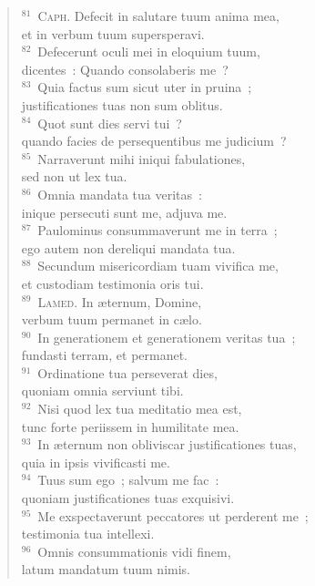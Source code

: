 \begin{flushleft}
\begin{verse}
${}^{81}$~\textsc{Caph.} Defecit in salutare tuum anima mea,\\ et in verbum tuum supersperavi.\\
${}^{82}$~Defecerunt oculi mei in eloquium tuum,\\ dicentes~: Quando consolaberis me~?\\
${}^{83}$~Quia factus sum sicut uter in pruina~;\\ justificationes tuas non sum oblitus.\\
${}^{84}$~Quot sunt dies servi tui~?\\ quando facies de persequentibus me judicium~?\\
${}^{85}$~Narraverunt mihi iniqui fabulationes,\\ sed non ut lex tua.\\
${}^{86}$~Omnia mandata tua veritas~:\\ inique persecuti sunt me, adjuva me.\\
${}^{87}$~Paulominus consummaverunt me in terra~;\\ ego autem non dereliqui mandata tua.\\
${}^{88}$~Secundum misericordiam tuam vivifica me,\\ et custodiam testimonia oris tui.\\
${}^{89}$~\textsc{Lamed.} In \ae ternum, Domine,\\ verbum tuum permanet in c\ae lo.\\
${}^{90}$~In generationem et generationem veritas tua~;\\ fundasti terram, et permanet.\\
${}^{91}$~Ordinatione tua perseverat dies,\\ quoniam omnia serviunt tibi.\\
${}^{92}$~Nisi quod lex tua meditatio mea est,\\ tunc forte periissem in humilitate mea.\\
${}^{93}$~In \ae ternum non obliviscar justificationes tuas,\\ quia in ipsis vivificasti me.\\
${}^{94}$~Tuus sum ego~; salvum me fac~:\\ quoniam justificationes tuas exquisivi.\\
${}^{95}$~Me exspectaverunt peccatores ut perderent me~;\\ testimonia tua intellexi.\\
${}^{96}$~Omnis consummationis vidi finem,\\ latum mandatum tuum nimis.\\

\end{verse}
\end{flushleft}
